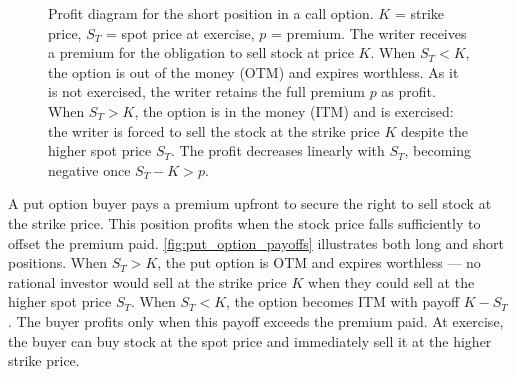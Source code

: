\documentclass[english,12pt,a4paper,pdftex,sci,utf8]{aaltothesis}
\begin{document}
\begin{figure}[tbp]
    \caption{Profit diagram for the short position in a call option. $K$ = strike price, $S_T$ = spot price at exercise, $p$ = premium. The writer receives a premium for the obligation to sell stock at price $K$. When $S_T < K$, the option is out of the money (OTM) and expires worthless. As it is not exercised, the writer retains the full premium $p$ as profit. When $S_T > K$, the option is in the money (ITM) and is exercised: the writer is forced to sell the stock at the strike price $K$ despite the higher spot price $S_T$. The profit decreases linearly with $S_T$, becoming negative once $S_T - K > p$.}
    \label{fig:short_call_payoff}
\end{figure}

A put option buyer pays a premium upfront to secure the right to sell stock at the strike price. This position profits when the stock price falls sufficiently to offset the premium paid. \cref{fig:put_option_payoffs} illustrates both long and short positions. When $S_T > K$, the put option is OTM and expires worthless --- no rational investor would sell at the strike price $K$ when they could sell at the higher spot price $S_T$. When $S_T < K$, the option becomes ITM with payoff $K - S_T$ \cite{hull2018}. The buyer profits only when this payoff exceeds the premium paid. At exercise, the buyer can buy stock at the spot price and immediately sell it at the higher strike price.
\end{document}
